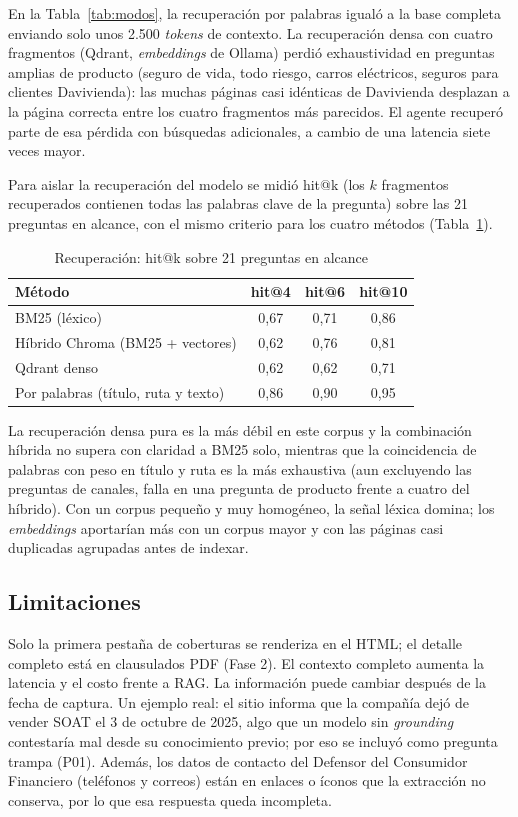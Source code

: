 \documentclass[journal]{IEEEtran}
\begin{document}
En la Tabla~\ref{tab:modos}, la recuperación por palabras igualó a la base completa enviando solo unos 2.500 \textit{tokens} de contexto. La recuperación densa con cuatro fragmentos (Qdrant, \textit{embeddings} de Ollama) perdió exhaustividad en preguntas amplias de producto (seguro de vida, todo riesgo, carros eléctricos, seguros para clientes Davivienda): las muchas páginas casi idénticas de Davivienda desplazan a la página correcta entre los cuatro fragmentos más parecidos. El agente recuperó parte de esa pérdida con búsquedas adicionales, a cambio de una latencia siete veces mayor.

Para aislar la recuperación del modelo se midió hit@k (los $k$ fragmentos recuperados contienen todas las palabras clave de la pregunta) sobre las 21 preguntas en alcance, con el mismo criterio para los cuatro métodos (Tabla~\ref{tab:hitk}).

\begin{table}[H]
\centering
\caption{Recuperación: hit@k sobre 21 preguntas en alcance}
\label{tab:hitk}
\begin{tabular}{lccc}
\hline
Método & hit@4 & hit@6 & hit@10 \\ \hline
BM25 (léxico) & 0,67 & 0,71 & 0,86 \\
Híbrido Chroma (BM25 + vectores) & 0,62 & 0,76 & 0,81 \\
Qdrant denso & 0,62 & 0,62 & 0,71 \\
Por palabras (título, ruta y texto) & 0,86 & 0,90 & 0,95 \\ \hline
\end{tabular}
\end{table}

La recuperación densa pura es la más débil en este corpus y la combinación híbrida no supera con claridad a BM25 solo, mientras que la coincidencia de palabras con peso en título y ruta es la más exhaustiva (aun excluyendo las preguntas de canales, falla en una pregunta de producto frente a cuatro del híbrido). Con un corpus pequeño y muy homogéneo, la señal léxica domina; los \textit{embeddings} aportarían más con un corpus mayor y con las páginas casi duplicadas agrupadas antes de indexar.

\subsection{Limitaciones}
Solo la primera pestaña de coberturas se renderiza en el HTML; el detalle completo está en clausulados PDF (Fase 2). El contexto completo aumenta la latencia y el costo frente a RAG. La información puede cambiar después de la fecha de captura. Un ejemplo real: el sitio informa que la compañía dejó de vender SOAT el 3 de octubre de 2025, algo que un modelo sin \textit{grounding} contestaría mal desde su conocimiento previo; por eso se incluyó como pregunta trampa (P01). Además, los datos de contacto del Defensor del Consumidor Financiero (teléfonos y correos) están en enlaces o íconos que la extracción no conserva, por lo que esa respuesta queda incompleta.
\end{document}
